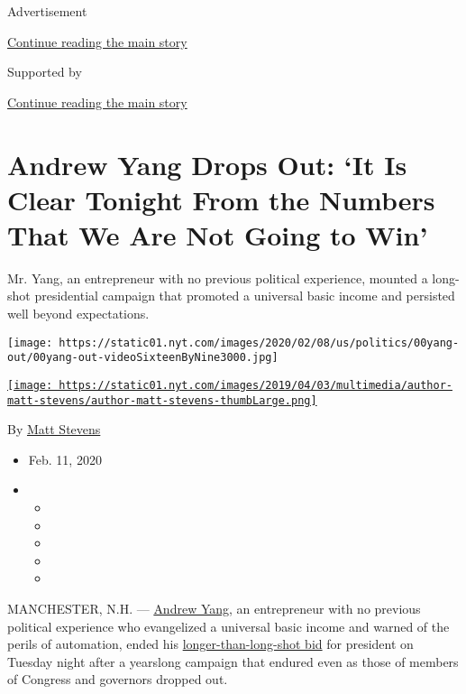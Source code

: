 Advertisement

\protect\hyperlink{after-top}{Continue reading the main story}

Supported by

\protect\hyperlink{after-sponsor}{Continue reading the main story}

\hypertarget{andrew-yang-drops-out-it-is-clear-tonight-from-the-numbers-that-we-are-not-going-to-win}{%
\section{Andrew Yang Drops Out: `It Is Clear Tonight From the Numbers
That We Are Not Going to
Win'}\label{andrew-yang-drops-out-it-is-clear-tonight-from-the-numbers-that-we-are-not-going-to-win}}

Mr. Yang, an entrepreneur with no previous political experience, mounted
a long-shot presidential campaign that promoted a universal basic income
and persisted well beyond expectations.

\texttt{[image: https://static01.nyt.com/images/2020/02/08/us/politics/00yang-out/00yang-out-videoSixteenByNine3000.jpg]}

\href{https://www.nytimes.com/by/matt-stevens}{\texttt{[image: https://static01.nyt.com/images/2019/04/03/multimedia/author-matt-stevens/author-matt-stevens-thumbLarge.png]}}

By \href{https://www.nytimes.com/by/matt-stevens}{Matt Stevens}

\begin{itemize}
\item
  Feb. 11, 2020
\item
  \begin{itemize}
  \item
  \item
  \item
  \item
  \item
  \end{itemize}
\end{itemize}

MANCHESTER, N.H. ---
\href{https://www.nytimes.com/2020/04/29/nyregion/andrew-yang-mayor-nyc.html}{Andrew
Yang}, an entrepreneur with no previous political experience who
evangelized a universal basic income and warned of the perils of
automation, ended his
\href{https://www.nytimes.com/2018/02/10/technology/his-2020-campaign-message-the-robots-are-coming.html}{longer-than-long-shot
bid} for president on Tuesday night after a yearslong campaign that
endured even as those of members of Congress and governors dropped out.

